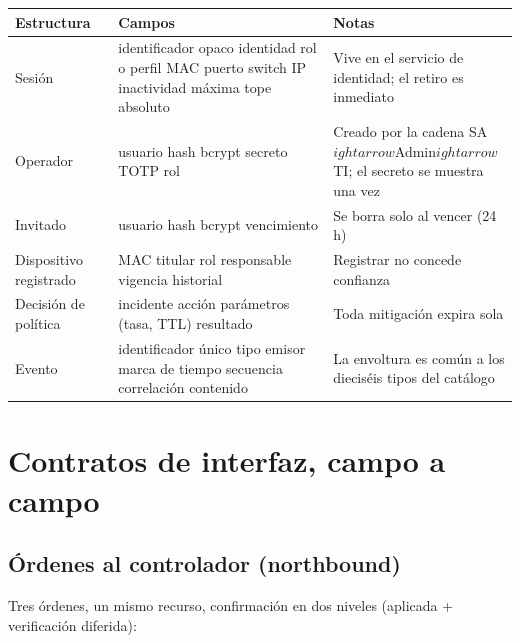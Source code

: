 \documentclass[11pt,a4paper]{article}
\begin{document}
\begin{longtable}{p{3.4cm}p{6.0cm}p{4.6cm}}
\toprule
\textbf{Estructura} & \textbf{Campos} & \textbf{Notas}\\
\midrule
Sesión & identificador opaco \textperiodcentered{} identidad \textperiodcentered{} rol o perfil \textperiodcentered{} MAC \textperiodcentered{} puerto \textperiodcentered{} switch \textperiodcentered{} IP \textperiodcentered{} inactividad máxima \textperiodcentered{} tope absoluto & Vive en el servicio de identidad; el retiro es inmediato\\
Operador & usuario \textperiodcentered{} hash bcrypt \textperiodcentered{} secreto TOTP \textperiodcentered{} rol & Creado por la cadena SA$
ightarrow$Admin$
ightarrow$TI; el secreto se muestra una vez\\
Invitado & usuario \textperiodcentered{} hash bcrypt \textperiodcentered{} vencimiento & Se borra solo al vencer (24 h)\\
Dispositivo registrado & MAC \textperiodcentered{} titular \textperiodcentered{} rol \textperiodcentered{} responsable \textperiodcentered{} vigencia \textperiodcentered{} historial & Registrar no concede confianza\\
Decisión de política & incidente \textperiodcentered{} acción \textperiodcentered{} parámetros (tasa, TTL) \textperiodcentered{} resultado & Toda mitigación expira sola\\
Evento & identificador único \textperiodcentered{} tipo \textperiodcentered{} emisor \textperiodcentered{} marca de tiempo \textperiodcentered{} secuencia \textperiodcentered{} correlación \textperiodcentered{} contenido & La envoltura es común a los dieciséis tipos del catálogo\\
\bottomrule
\end{longtable}

\section{Contratos de interfaz, campo a campo}

\subsection{Órdenes al controlador (northbound)}
Tres órdenes, un mismo recurso, confirmación en dos niveles (aplicada + verificación diferida):
\end{document}
